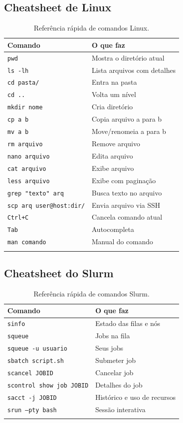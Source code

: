 \documentclass[11pt, a4paper]{article}
\newcommand{\cmd}[1]{\texttt{\textcolor{codeblue}{#1}}}
\begin{document}
\subsection{Cheatsheet de Linux}

\begin{longtable}{ll}
  \toprule
  \textbf{Comando} & \textbf{O que faz} \\
  \midrule
  \endhead
  \cmd{pwd} & Mostra o diretório atual \\
  \cmd{ls -lh} & Lista arquivos com detalhes \\
  \cmd{cd pasta/} & Entra na pasta \\
  \cmd{cd ..} & Volta um nível \\
  \cmd{mkdir nome} & Cria diretório \\
  \cmd{cp a b} & Copia arquivo a para b \\
  \cmd{mv a b} & Move/renomeia a para b \\
  \cmd{rm arquivo} & Remove arquivo \\
  \cmd{nano arquivo} & Edita arquivo \\
  \cmd{cat arquivo} & Exibe arquivo \\
  \cmd{less arquivo} & Exibe com paginação \\
  \cmd{grep "texto" arq} & Busca texto no arquivo \\
  \cmd{scp arq user@host:dir/} & Envia arquivo via SSH \\
  \cmd{Ctrl+C} & Cancela comando atual \\
  \cmd{Tab} & Autocompleta \\
  \cmd{man comando} & Manual do comando \\
  \bottomrule
  \caption{Referência rápida de comandos Linux.}
\end{longtable}

\subsection{Cheatsheet do Slurm}

\begin{longtable}{ll}
  \toprule
  \textbf{Comando} & \textbf{O que faz} \\
  \midrule
  \endhead
  \cmd{sinfo} & Estado das filas e nós \\
  \cmd{squeue} & Jobs na fila \\
  \cmd{squeue -u usuario} & Seus jobs \\
  \cmd{sbatch script.sh} & Submeter job \\
  \cmd{scancel JOBID} & Cancelar job \\
  \cmd{scontrol show job JOBID} & Detalhes do job \\
  \cmd{sacct -j JOBID} & Histórico e uso de recursos \\
  \cmd{srun --pty bash} & Sessão interativa \\
  \bottomrule
  \caption{Referência rápida de comandos Slurm.}
\end{longtable}
\end{document}
